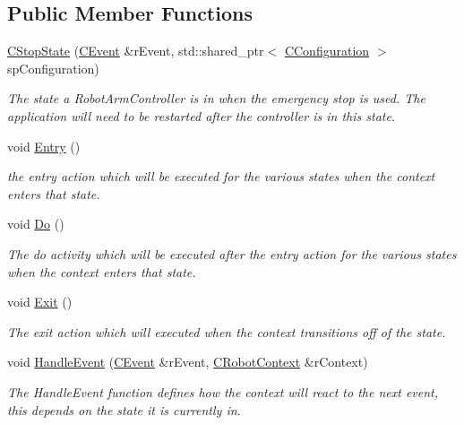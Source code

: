 \subsection*{Public Member Functions}
\begin{DoxyCompactItemize}
\item 
\hyperlink{classCStopState_ac1e10af0a555c8d0df9964d2bf67172c}{C\+Stop\+State} (\hyperlink{classCEvent}{C\+Event} \&r\+Event, std\+::shared\+\_\+ptr$<$ \hyperlink{classCConfiguration}{C\+Configuration} $>$ sp\+Configuration)
\begin{DoxyCompactList}\small\item\em The state a Robot\+Arm\+Controller is in when the emergency stop is used. The application will need to be restarted after the controller is in this state. \end{DoxyCompactList}\item 
void \hyperlink{classCStopState_aae7dbdb7db312f20a16fcd48edc60e83}{Entry} ()
\begin{DoxyCompactList}\small\item\em the entry action which will be executed for the various states when the context enters that state. \end{DoxyCompactList}\item 
void \hyperlink{classCStopState_aba51445ef29e03fa5ffc5cef48923a10}{Do} ()
\begin{DoxyCompactList}\small\item\em The do activity which will be executed after the entry action for the various states when the context enters that state. \end{DoxyCompactList}\item 
void \hyperlink{classCStopState_a2bf7d1e44a9b0c689c86fb00f9684a7b}{Exit} ()
\begin{DoxyCompactList}\small\item\em The exit action which will executed when the context transitions off of the state. \end{DoxyCompactList}\item 
void \hyperlink{classCStopState_abe6af38d9c6b80b98fd78cdb48d7599c}{Handle\+Event} (\hyperlink{classCEvent}{C\+Event} \&r\+Event, \hyperlink{classCRobotContext}{C\+Robot\+Context} \&r\+Context)
\begin{DoxyCompactList}\small\item\em The Handle\+Event function defines how the context will react to the next event, this depends on the state it is currently in. \end{DoxyCompactList}\end{DoxyCompactItemize}


